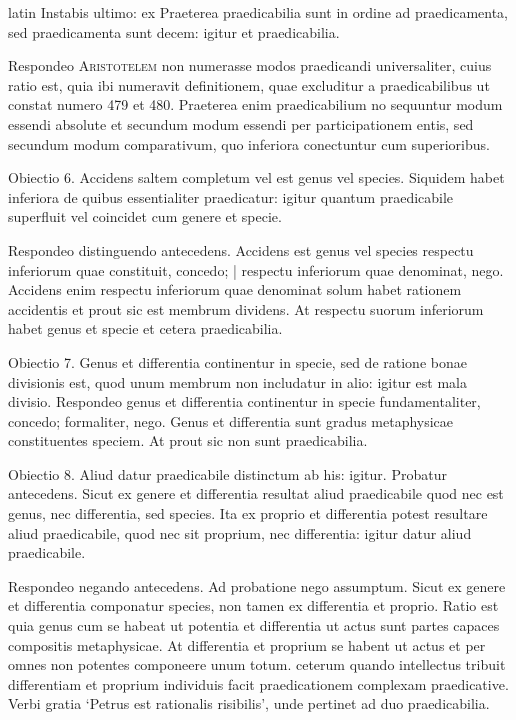 \begin{otherlanguage*}{latin}
\pstart
  Instabis ultimo: ex  Praeterea praedicabilia sunt in ordine ad praedicamenta, sed praedicamenta sunt decem: igitur et praedicabilia. 
\pend

\pstart
  Respondeo \textsc{Aristotelem} non numerasse modos praedicandi universaliter, cuius ratio est, quia ibi numeravit definitionem, quae excluditur a praedicabilibus ut constat numero 479 et 480. Praeterea enim praedicabilium no sequuntur modum essendi absolute et secundum modum essendi per participationem entis, sed secundum modum comparativum, quo inferiora conectuntur cum superioribus. 
\pend

\pstart
  Obiectio 6. Accidens saltem completum vel est genus vel species. Siquidem habet inferiora de quibus essentialiter praedicatur: igitur quantum praedicabile superfluit vel coincidet cum genere et specie. 
\pend

\pstart
  Respondeo distinguendo antecedens. Accidens est genus vel species respectu inferiorum quae constituit, concedo; \textnormal{|} respectu inferiorum quae denominat, nego. Accidens enim respectu inferiorum quae denominat solum habet rationem accidentis et prout sic est membrum dividens. At respectu suorum inferiorum habet genus et specie et cetera praedicabilia. 
\pend

\pstart
  Obiectio 7. Genus et differentia continentur in specie, sed de ratione bonae divisionis est, quod unum membrum non includatur in alio: igitur est mala divisio. Respondeo genus et differentia continentur in specie fundamentaliter, concedo; formaliter, nego. Genus et differentia sunt gradus metaphysicae constituentes speciem. At prout sic non sunt praedicabilia. 
\pend

\pstart
  Obiectio 8. Aliud datur praedicabile distinctum ab his: igitur. Probatur antecedens. Sicut ex genere et differentia resultat aliud praedicabile quod nec est genus, nec differentia, sed species. Ita ex proprio et differentia potest resultare aliud praedicabile, quod nec sit proprium, nec differentia: igitur datur aliud praedicabile. 
\pend

\pstart
  Respondeo negando antecedens. Ad probatione nego assumptum. Sicut ex genere et differentia componatur species, non tamen ex differentia et proprio. Ratio est quia genus cum se habeat ut potentia et differentia ut actus sunt partes capaces compositis metaphysicae. At differentia et proprium se habent ut actus et per omnes non potentes componeere unum totum. ceterum quando intellectus tribuit differentiam et proprium individuis facit praedicationem complexam praedicative. Verbi gratia `Petrus est rationalis risibilis', unde pertinet ad duo praedicabilia. 
\pend


\end{otherlanguage*}
